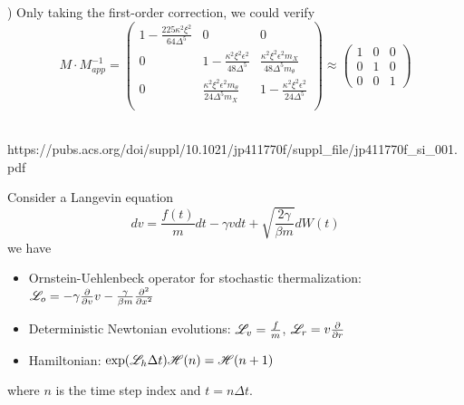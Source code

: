 \documentclass[books,12pt]{elegantpaper}
\begin{document}
\right)  \eeq
Only taking the first-order correction, we could verify
$$ M \cdot M^{-1}_{app} = \left( \begin{array}{ccc} 1-\frac{225 \kappa ^2 \xi ^2}{64 \Delta ^5} & 0 & 0 \\ 0 & 1-\frac{\kappa ^2 \xi ^2 \epsilon ^2}{48 \Delta ^5} & \frac{\kappa ^2 \xi ^2 \epsilon ^2 m_X}{48 \Delta ^5 m_{\theta }} \\ 0 & \frac{\kappa ^2 \xi ^2 \epsilon ^2 m_{\theta }}{24 \Delta ^5 m_X} & 1-\frac{\kappa ^2 \xi ^2 \epsilon ^2}{24 \Delta ^5} \\ \end{array} \right) \approx \left(\begin{array}{ccc}1 & 0 & 0 \\0 & 1 & 0 \\0 & 0 & 1\end{array}\right)$$







{}
\\
https://pubs.acs.org/doi/suppl/10.1021/jp411770f/suppl\_file/jp411770f\_si\_001.pdf

Consider a Langevin equation
$$ dv = \frac{f(t)}{m} dt - \gamma v dt + \sqrt{\frac{2\gamma}{\beta m}} dW(t) $$
we have 
\begin{itemize}
  \item Ornstein-Uehlenbeck operator for stochastic thermalization: $\mathscr{L}_o = -\gamma \frac{\partial}{\partial v} v - \frac{\gamma}{\beta m} \pdv[2]{}{x}$
  \item Deterministic Newtonian evolutions: $\mathscr{L}_v = \frac{f}{m}$, $\mathscr{L}_r = v \frac{\partial}{\partial r}$
  \item Hamiltonian: $\exp(\mathscr{L}_h \Delta t) \mathscr{H}(n) = \mathscr{H}(n+1)$
\end{itemize}
where $n$ is the time step index and $t=n\Delta t$.
\end{document}

